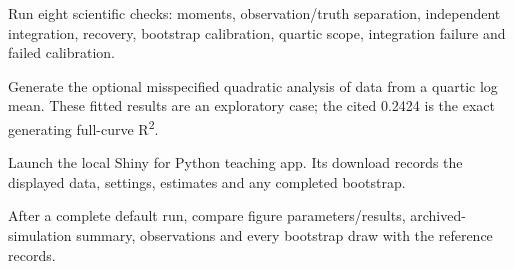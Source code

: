 \begin{description}[style=nextline]
\item[estimation checks] Run eight scientific checks: moments, observation/truth separation, independent integration, recovery, bootstrap calibration, quartic scope, integration failure and failed calibration.
\begin{quote}\small\ttfamily\raggedright{}\end{quote}

\item[quartic case] Generate the optional misspecified quadratic analysis of data from a quartic log mean. These fitted results are an exploratory case; the cited 0.2424 is the exact generating full-curve R\textsuperscript{2}.
\begin{quote}\small\ttfamily\raggedright{}\end{quote}

\item[shiny] Launch the local Shiny for Python teaching app. Its download records the displayed data, settings, estimates and any completed bootstrap.
\begin{quote}\small\ttfamily\raggedright{}\end{quote}

\item[reference comparison] After a complete default run, compare figure parameters/results, archived-simulation summary, observations and every bootstrap draw with the reference records.
\begin{quote}\small\ttfamily\raggedright{}\end{quote}

\end{description}
